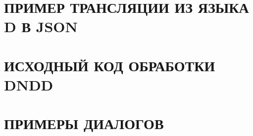 \renewcommand{\thechapter}{\Asbuk{chapter}}
\chapter{ПРИМЕР ТРАНСЛЯЦИИ ИЗ ЯЗЫКА D В JSON}
\label{app:d2json}
\chapter{ИСХОДНЫЙ КОД ОБРАБОТКИ DNDD}
\label{app:code}
\chapter{ПРИМЕРЫ ДИАЛОГОВ}
\label{app:diagogue}